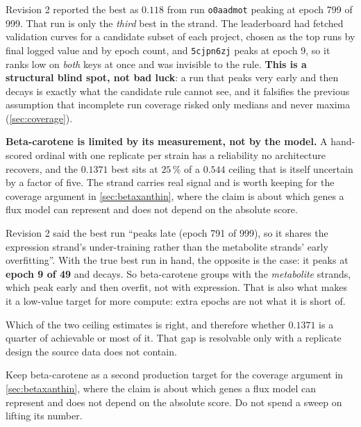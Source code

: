 Revision 2 reported the best as $0.118$ from run \texttt{o0aadmot} peaking at epoch 799 of
999. That run is only the \emph{third} best in the strand. The leaderboard had fetched
validation curves for a candidate subset of each project, chosen as the top runs by final
logged value and by epoch count, and \texttt{5cjpn6zj} peaks at epoch 9, so it ranks low on
\emph{both} keys at once and was invisible to the rule. \textbf{This is a structural blind
spot, not bad luck}: a run that peaks very early and then decays is exactly what the
candidate rule cannot see, and it falsifies the previous assumption that incomplete run
coverage risked only medians and never maxima (\cref{sec:coverage}).

\begin{keybox}
\textbf{Beta-carotene is limited by its measurement, not by the model.} A hand-scored
ordinal with one replicate per strain has a reliability no architecture recovers, and the
$0.1371$ best  sits at $25\,\%$ of a $0.544$ ceiling that is
itself uncertain by a factor of five. The strand carries real signal and is worth keeping
for the coverage argument in \cref{sec:betaxanthin}, where the claim is about which genes a
flux model can represent and does not depend on the absolute score.
\end{keybox}

 Revision 2
said the best run ``peaks late (epoch 791 of 999), so it shares the expression strand's
under-training rather than the metabolite strands' early overfitting''. With the true best
run in hand, the opposite is the case: it peaks at \textbf{epoch 9 of 49} and decays. So
beta-carotene groups with the \emph{metabolite} strands, which peak early and then overfit,
not with expression. That is also what makes it a low-value target for more compute: extra
epochs are not what it is short of.

 Which of the two ceiling estimates is right, and therefore whether
$0.1371$ is a quarter of achievable or most of it. That gap is resolvable only with a
replicate design the source data does not contain.

 Keep beta-carotene as a second production target for the coverage
argument in \cref{sec:betaxanthin}, where the claim is about which genes a flux model can
represent and does not depend on the absolute score. Do not spend a sweep on lifting its
number.

